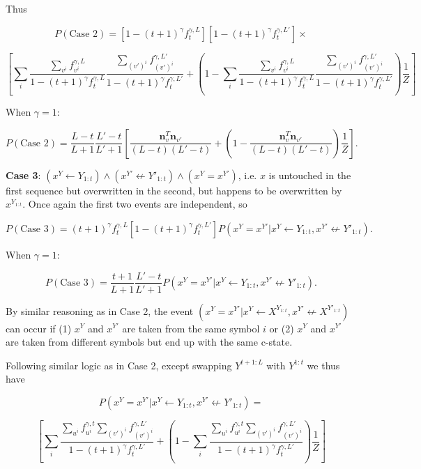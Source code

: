 \documentclass{article}
\begin{document}
Thus

$$P(\textrm{Case 2}) = [1 - (t+1)^\gamma f^{\gamma,L}_t][1 - (t+1)^\gamma f^{\gamma,L'}_t] \times$$

$$\left[
\sum_i \frac{\sum\limits_{v^i} f^{\gamma,L}_{v^i}}{1 - (t+1)^\gamma f^{\gamma,L}_t} \frac{\sum\limits_{(v')^i} f^{\gamma,L'}_{(v')^i}}{1 - (t+1)^\gamma f^{\gamma,L'}_t} + \left(1 - \sum_i \frac{\sum\limits_{v^i} f^{\gamma,L}_{v^i}}{1 - (t+1)^\gamma f^{\gamma,L}_t} \frac{\sum\limits_{(v')^i} f^{\gamma,L'}_{(v')^i}}{1 - (t+1)^\gamma f^{\gamma,L'}_t}\right)\frac{1}{Z}
\right]$$

When $\gamma = 1$:

$$P(\textrm{Case 2}) = \frac{L-t}{L+1}\frac{L'-t}{L'+1}\left[\frac{\mathbf{n}^T_v\mathbf{n}_{v'}}{(L-t)(L'-t)} + \left(1 - \frac{\mathbf{n}^T_v\mathbf{n}_{v'}}{(L-t)(L'-t)} \right)\frac{1}{Z}\right].$$

\textbf{Case 3}: $(x^Y \leftarrow Y_{1:t}) \land (x^{Y'} \not\leftarrow Y'_{1:t}) \land (x^Y = x^{Y'})$, i.e. $x$ is untouched in the first sequence but overwritten in the second, but happens to be overwritten by $x^{Y_{1:t}}$. Once again the first two events are independent, so 

$$P(\textrm{Case 3}) = (t+1)^\gamma f^{\gamma,L}_t[1-(t+1)^\gamma f^{\gamma,L'}_t]P(x^Y = x^{Y'}|x^Y \leftarrow Y_{1:t}, x^{Y'} \not\leftarrow Y'_{1:t}).$$

When $\gamma = 1$:

$$P(\textrm{Case 3}) = \frac{t+1}{L+1}\frac{L'-t}{L'+1}P(x^Y = x^{Y'}|x^Y \leftarrow Y_{1:t}, x^{Y'} \not\leftarrow Y'_{1:t}).$$

By similar reasoning as in Case 2, the event $(x^Y = x^{Y'}|x^Y \leftarrow X^{Y_{1:t}}, x^{Y'} \not\leftarrow X^{Y'_{1:t}})$ can occur if (1) $x^Y$ and $x^{Y'}$ are taken from the same symbol $i$ or (2) $x^Y$ and $x^{Y'}$ are taken from different symbols but end up with the same c-state.

Following similar logic as in Case 2, except swapping $Y^{t+1:L}$ with $Y^{1:t}$ we thus have

$$P(x^Y = x^{Y'}|x^Y \leftarrow Y_{1:t}, x^{Y'} \not\leftarrow Y'_{1:t}) =$$

$$\left[
\sum_i \frac{\sum\limits_{u^i} f_{u^i}^{\gamma, t} \sum\limits_{(v')^i} f_{(v')^i}^{\gamma,L'}}{1 - (t+1)^\gamma f^{\gamma,L'}_t} 
+ \left(1 - \sum_i \frac{\sum\limits_{u^i} f_{u^i}^{\gamma, t} \sum\limits_{(v')^i} f_{(v')^i}^{\gamma,L'}}{1 - (t+1)^\gamma f^{\gamma,L'}_t}\right)\frac{1}{Z}
\right]$$
\end{document}

